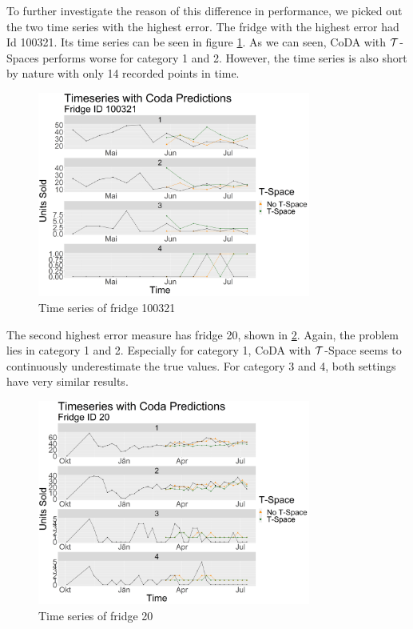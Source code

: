To further investigate the reason of this difference in performance, we picked out the two time series with the highest error. The fridge with the highest error had Id 100321. Its time series can be seen in figure \ref{fig:Coda_Timeseries_VariationtSpace100321}. As we can seen, CoDA with $\mathcal{T}$-Spaces performs worse for category 1 and 2. However, the time series is also short by nature with only 14 recorded points in time.  

\begin{figure}[htbp]
	\centering
		\includegraphics[width=0.80\textwidth]{Graphiken/Coda_Timeseries_VariationtSpace100321.png}
	\caption{Time series of fridge 100321}
	\label{fig:Coda_Timeseries_VariationtSpace100321}
\end{figure}

The second highest error measure has fridge 20, shown in \ref{fig:Coda_Timeseries_VariationtSpace20}. Again, the problem lies in category 1 and 2. Especially for category 1, CoDA with $\mathcal{T}$-Space seems to continuously underestimate the true values. For category 3 and 4, both settings have very similar results.

\begin{figure}[htbp]
	\centering
		\includegraphics[width=0.80\textwidth]{Graphiken/Coda_Timeseries_VariationtSpace20.png}
	\caption{Time series of fridge 20}
	\label{fig:Coda_Timeseries_VariationtSpace20}
\end{figure}

